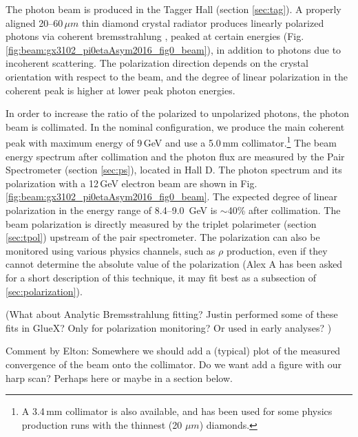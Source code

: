 The photon beam is produced in the Tagger Hall (section \ref{sec:tag}).
A properly aligned 20--60\,$\mu m$ thin diamond crystal radiator produces linearly polarized photons via coherent bremsstrahlung \cite{timm1969,LIVINGSTON2009205}, peaked at certain energies (Fig.\,\ref{fig:beam:gx3102_pi0etaAsym2016_fig0_beam}), in addition to photons due to incoherent scattering.
The polarization direction depends on the crystal orientation with respect to the beam, and the degree of linear polarization in the coherent peak is higher at lower peak photon energies.

In order to increase the ratio of the polarized to unpolarized photons, the photon beam is collimated.  In the nominal \GX{} configuration, we produce the main coherent peak
with maximum energy of 9\,GeV and use a 5.0\,mm collimator.\footnote{A 3.4\,mm collimator is also available, and has been used for some physics production runs with the thinnest (20 $\mu m$) diamonds.}
The beam energy spectrum after collimation and the photon flux are measured by the Pair
Spectrometer (section \ref{sec:ps}), located in Hall D. The photon spectrum and its polarization with a 12\,GeV electron beam are shown in Fig.\,\ref{fig:beam:gx3102_pi0etaAsym2016_fig0_beam}.
The expected degree of linear polarization in the energy range of 8.4--9.0~GeV is $\sim$40\% after collimation. 
The beam polarization is directly measured by the triplet polarimeter (section \ref{sec:tpol}) upstream of the pair spectrometer. The polarization can also be monitored using various physics channels, such as $\rho$ production, even if they cannot determine the absolute value of the polarization {\color{red}(Alex A has been asked for a short description of this technique, it may fit best as a subsection of \ref{sec:polarization})}\cite{gx3076}.

{\color{red} (What about Analytic Bremsstrahlung fitting? Justin performed some of these fits in GlueX? Only for polarization monitoring? Or used in early analyses? \cite{clasnote2011020})}

{\color{red} Comment by Elton: Somewhere we should add a (typical) plot of the measured convergence of the beam onto the collimator. Do we want add a figure with our harp scan? Perhaps here or maybe in a section below.} 

